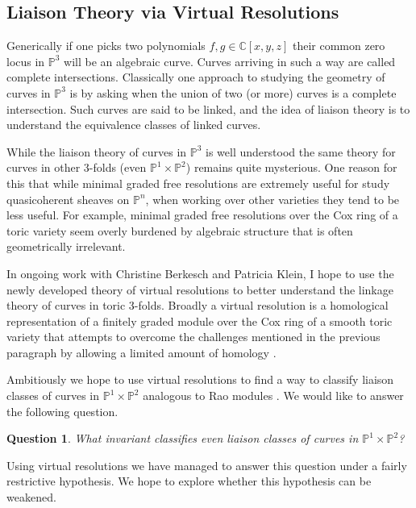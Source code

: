 \documentclass[11pt,reqno]{amsart}
\newtheorem{question}[lemma]{Question}
\theoremstyle{remark}
\newcommand{\C}{\mathbb{C}}
\renewcommand{\P}{\mathbb{P}}
\begin{document}
\subsection{Liaison Theory via Virtual Resolutions}

Generically if one picks two polynomials $f,g\in \C[x,y,z]$ their common zero locus in $\P^3$ will be an algebraic curve. Curves arriving in such a way are called complete intersections. Classically one approach to studying the geometry of curves in $\P^3$ is by asking when the union of two (or more) curves is a complete intersection. Such curves are said to be linked, and the idea of liaison theory is to understand the equivalence classes of linked curves. 

While the liaison theory of curves in $\P^3$ is well understood the same theory for curves in other 3-folds (even $\P^1\times\P^2$) remains quite mysterious. One reason for this that while minimal graded free resolutions are  extremely useful for study quasicoherent sheaves on $\P^n$, when working over other varieties  they tend to be less useful. For example, minimal graded free resolutions over the Cox ring of a toric variety seem overly burdened by algebraic structure that is often geometrically irrelevant. 

In ongoing work with Christine Berkesch and Patricia Klein, I hope to use the newly developed theory of virtual resolutions to better understand the linkage theory of curves in toric 3-folds. Broadly a virtual resolution is a homological representation of a finitely graded module over the Cox ring of a smooth toric variety that attempts to overcome the challenges mentioned in the previous paragraph by allowing a limited amount of homology \cite{berkeschErmanSmith17}. 


Ambitiously we hope to use virtual resolutions to find a way to classify liaison classes of curves in $\P^1\times\P^2$ analogous to Rao modules \cite{rao78}. We would like to answer the following question. 
 
\begin{question}\label{quest:virtual-rao}
What invariant classifies even liaison classes of curves in $\P^1\times\P^2$?
\end{question}

Using virtual resolutions we have managed to answer this question under a fairly restrictive hypothesis. We hope to explore whether this hypothesis can be weakened. 
\end{document}
